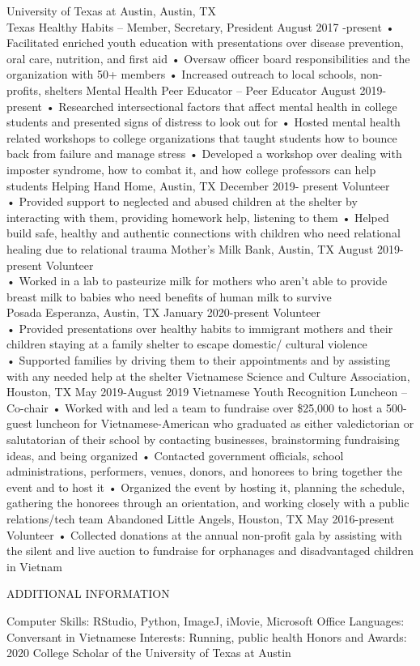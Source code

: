 \documentclass[]{article}
\begin{document}
University of Texas at Austin, Austin, TX\\
Texas Healthy Habits -- Member, Secretary, President August 2017
-present • Facilitated enriched youth education with presentations over
disease prevention, oral care, nutrition, and first aid • Oversaw
officer board responsibilities and the organization with 50+ members •
Increased outreach to local schools, non-profits, shelters Mental Health
Peer Educator -- Peer Educator August 2019-present • Researched
intersectional factors that affect mental health in college students and
presented signs of distress to look out for • Hosted mental health
related workshops to college organizations that taught students how to
bounce back from failure and manage stress • Developed a workshop over
dealing with imposter syndrome, how to combat it, and how college
professors can help students Helping Hand Home, Austin, TX December
2019- present Volunteer\\
• Provided support to neglected and abused children at the shelter by
interacting with them, providing homework help, listening to them •
Helped build safe, healthy and authentic connections with children who
need relational healing due to relational trauma Mother's Milk Bank,
Austin, TX August 2019- present Volunteer\\
• Worked in a lab to pasteurize milk for mothers who aren't able to
provide breast milk to babies who need benefits of human milk to
survive\\
Posada Esperanza, Austin, TX January 2020-present Volunteer\\
• Provided presentations over healthy habits to immigrant mothers and
their children staying at a family shelter to escape domestic/ cultural
violence\\
• Supported families by driving them to their appointments and by
assisting with any needed help at the shelter Vietnamese Science and
Culture Association, Houston, TX May 2019-August 2019 Vietnamese Youth
Recognition Luncheon -- Co-chair • Worked with and led a team to
fundraise over \$25,000 to host a 500-guest luncheon for
Vietnamese-American who graduated as either valedictorian or
salutatorian of their school by contacting businesses, brainstorming
fundraising ideas, and being organized • Contacted government officials,
school administrations, performers, venues, donors, and honorees to
bring together the event and to host it • Organized the event by hosting
it, planning the schedule, gathering the honorees through an
orientation, and working closely with a public relations/tech team
Abandoned Little Angels, Houston, TX May 2016-present Volunteer •
Collected donations at the annual non-profit gala by assisting with the
silent and live auction to fundraise for orphanages and disadvantaged
children in Vietnam

ADDITIONAL INFORMATION

Computer Skills: RStudio, Python, ImageJ, iMovie, Microsoft Office
Languages: Conversant in Vietnamese Interests: Running, public health
Honors and Awards: 2020 College Scholar of the University of Texas at
Austin
\end{document}
